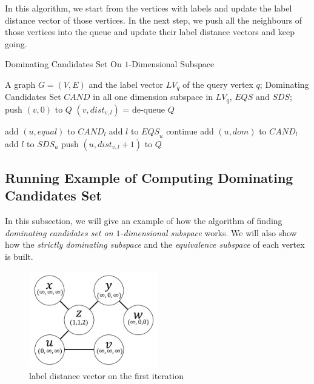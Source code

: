 In this algorithm, we start from the vertices with labels and update the label distance vector of those vertices. In the next step, we push all the neighbours of those vertices into the queue and update their label distance vectors and keep going. 
\begin{algorithm}[h]
  \caption{Dominating Candidates Set On $1$-Dimensional Subspace}\label{algo:blah}
  \begin{algorithmic}[1]
  \show\LOOP
    \REQUIRE A graph $G=(V,E)$ and the label vector $LV_q$ of the query vertex $q$;
    \ENSURE Dominating Candidates Set $\mathit{CAND}$ in all one dimension subspace in $LV_q$, $\mathit{EQS}$ and $\mathit{SDS}$;
            \STATE push $\left(v, 0\right)$ to $Q$
        \ENDFOR
    \ENDFOR
            \STATE $\left(v, dist_{v,l}\right)$ = de-queue $Q$
            
                \STATE add $\left(u, equal\right)$ to $\mathit{CAND}_l$
                \STATE add $l$ to $\mathit{EQS}_u$
                \STATE continue
            \ENDIF
            \STATE add $\left(u, dom\right)$ to $\mathit{CAND}_l$
            \STATE add $l$ to $\mathit{SDS}_u$
                \STATE push $\left(u, dist_{v,l}+1\right)$ to $Q$
            \ENDFOR
        \ENDFOR
    \ENDWHILE
  \end{algorithmic}
\end{algorithm}

\subsection{Running Example of Computing Dominating Candidates Set}

In this subsection, we will give an example of how the algorithm of finding \emph{dominating candidates set on $1$-dimensional subspace} works. We will also show how the \emph{strictly dominating subspace} and the \emph{equivalence subspace} of each vertex is built.

\begin{figure}[H]
    \centering
    \includegraphics[width=0.5\textwidth]{figs/graph_example_1}
    \caption{\label{font-figure}label distance vector on the first iteration}
    \label{fig:cand_step1}
\end{figure}

